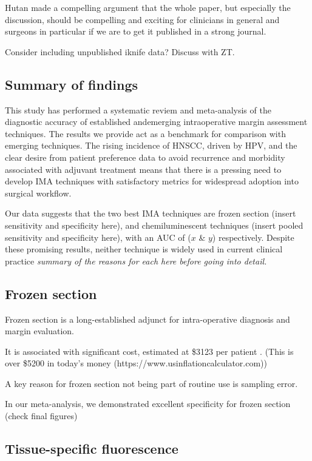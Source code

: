 Hutan made a compelling argument that the whole paper, but especially the discussion, should be compelling and exciting for clinicians in general and surgeons in particular if we are to get it published in a strong journal.

Consider including unpublished iknife data? Discuss with ZT.

\subsection{Summary of findings}

This study has performed a systematic reviem and meta-analysis of the diagnostic accuracy of established andemerging intraoperative margin assessment techniques.
The results we provide act as a benchmark for comparison with emerging techniques.
The rising incidence of HNSCC, driven by HPV, and the clear desire from patient preference data to avoid recurrence and morbidity associated with adjuvant treatment means that there is a pressing need to develop IMA techniques with satisfactory metrics for widespread adoption into surgical workflow.

Our data suggests that the two best IMA techniques are frozen section (insert sensitivity and specificity here), and chemiluminescent techniques (insert pooled sensitivity and specificity here), with an AUC of ($x$ \& $y$) respectively.
Despite these promising results, neither technique is widely used in current clinical practice
\emph{summary of the reasons for each here before going into detail.}

\subsection{Frozen section}

Frozen section is a long-established adjunct for intra-operative diagnosis and margin evaluation.

It is associated with significant cost, estimated at \$3123 per patient \cite{dinardoAccuracyUtilityCost2000}. 
(This is over \$5200 in today's money (https://www.usinflationcalculator.com))

A key reason for frozen section not being part of routine use is sampling error.

In our meta-analysis, we demonstrated excellent specificity for frozen section (check final figures)






\subsection{Tissue-specific fluorescence}

